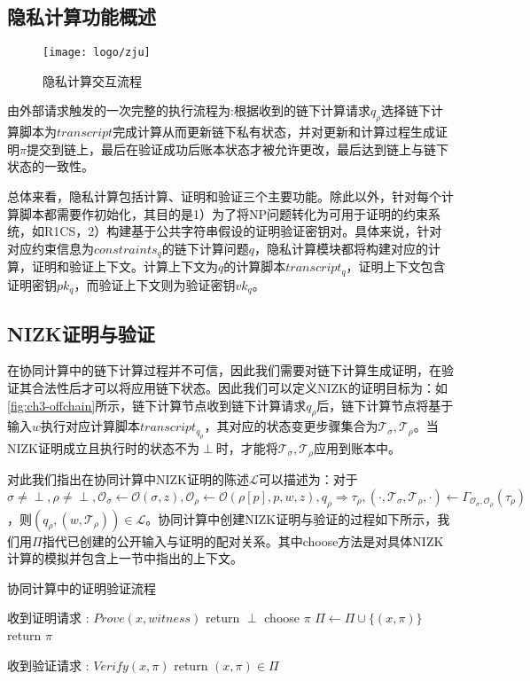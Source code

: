 \subsection{隐私计算功能概述}
\begin{figure}[htbp]
    \centering
    \texttt{[image: logo/zju]}
    \caption{\label{fig:ch3-offchain}隐私计算交互流程}
\end{figure}
由外部请求触发的一次完整的执行流程为:根据收到的链下计算请求$q_\rho$选择链下计算脚本为$transcript$完成计算从而更新链下私有状态，并对更新和计算过程生成证明$\pi$提交到链上，最后在验证成功后账本状态才被允许更改，最后达到链上与链下状态的一致性。

总体来看，隐私计算包括计算、证明和验证三个主要功能。除此以外，针对每个计算脚本都需要作初始化，其目的是1）为了将NP问题转化为可用于证明的约束系统，如R1CS，2）构建基于公共字符串假设的证明验证密钥对。具体来说，针对对应约束信息为$constraints_q$的链下计算问题$q$，隐私计算模块都将构建对应的计算，证明和验证上下文。计算上下文为$q$的计算脚本$transcript_q$，证明上下文包含证明密钥$pk_q$，而验证上下文则为验证密钥$vk_q$。

\subsection{NIZK证明与验证}
在协同计算中的链下计算过程并不可信，因此我们需要对链下计算生成证明，在验证其合法性后才可以将应用链下状态。因此我们可以定义NIZK的证明目标为：如\autoref{fig:ch3-offchain}所示，链下计算节点收到链下计算请求$q_\rho$后，链下计算节点将基于输入$w$执行对应计算脚本$transcript_{q_\rho}$，其对应的状态变更步骤集合为$\mathcal{T}_\sigma, \mathcal{T}_\rho$。当NIZK证明成立且执行时的状态不为$\perp$时，才能将$\mathcal{T}_\sigma, \mathcal{T}_\rho$应用到账本中。

对此我们指出在协同计算中NIZK证明的陈述$\mathcal{L}$可以描述为：对于$\sigma \neq \perp, \rho \neq \perp, \mathcal{O}_\sigma \leftarrow \mathcal{O}(\sigma, z), \mathcal{O}_\rho \leftarrow \mathcal{O}(\rho[p], p, w, z), q_\rho \Rightarrow \tau_\rho, (\cdot, \mathcal{T}_\sigma, \mathcal{T}_\rho, \cdot) \leftarrow \Gamma_{\mathcal{O}_\sigma, \mathcal{O}_\rho}(\tau_\rho)$，则$(q_\rho, (w, \mathcal{T}_\rho)) \in \mathcal{L}$。协同计算中创建NIZK证明与验证的过程如下所示，我们用$\Pi$指代已创建的公开输入与证明的配对关系。其中choose方法是对具体NIZK计算的模拟并包含上一节中指出的上下文。

\begin{breakablealgorithm}
    \caption{协同计算中的证明验证流程}
    \label{alg:ch3-5}
    \begin{algorithmic} 
        \item [收到证明请求]: $Prove(x, witness)$
        \STATE return $\perp$
        \ENDIF
        \REPEAT
        \STATE choose $\pi$
        \UNTIL {$\pi \neq \perp \wedge (\cdot, \pi) \notin \Pi$}
        \STATE $\Pi \leftarrow \Pi \cup \{(x, \pi)\}$
        \STATE return $\pi$
        
        \item [收到验证请求]: $Verify(x, \pi)$
        \STATE return $(x, \pi) \in \Pi$
    \end{algorithmic}
\end{breakablealgorithm}